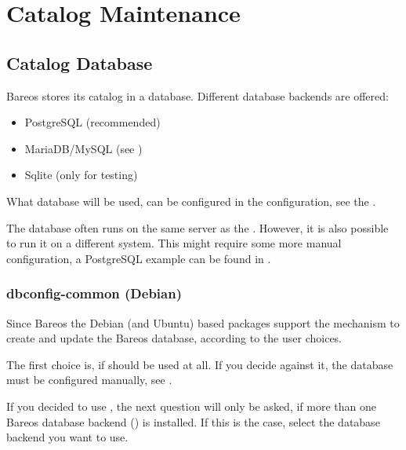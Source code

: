 
\chapter{Catalog Maintenance}
\label{CatMaintenanceChapter}

\section{Catalog Database}

Bareos stores its catalog in a database.
Different database backends are offered:
\begin{itemize}
    \item PostgreSQL (recommended)
    \item MariaDB/MySQL (see )
    \item Sqlite (only for testing)
\end{itemize}

What database will be used, can be configured in the \bareosDir configuration, see the .

The database often runs on the same server as the \bareosDir.
However, it is also possible to run it on a different system.
This might require some more manual configuration, a PostgreSQL example can be found in .



\subsection{dbconfig-common (Debian)}
\label{sec:dbconfig}

Since Bareos  the Debian (and Ubuntu) based packages support the  mechanism to create and update the Bareos database, according to the user choices.

The first choice is, if  should be used at all.
If you decide against it, the database must be configured manually, see .

If you decided to use , the next question will only be asked, if more than one
Bareos database backend () is installed.
If this is the case, select the database backend you want to use.


